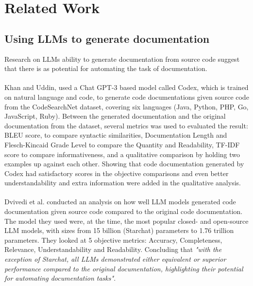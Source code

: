 \section{Related Work}
\subsection{Using LLMs to generate documentation}
\label{sec:related work LLM}
Research on LLMs ability to generate documentation from source code suggest that there is as potential for automating the task of documentation.
\\ \\
Khan and Uddin, \cite{10.1145/3551349.3559548} used a Chat GPT-3 based model called Codex, which is trained on natural language and code, to generate code documentations given source code from the CodeSearchNet dataset, covering six languages (Java, Python, PHP, Go, JavaScript, Ruby). Between the generated documentation and the original documentation from the dataset, several metrics was used to evaluated the result: BLEU score, to compare syntactic similarities, Documentation Length and Flesch-Kincaid Grade Level to compare the Quantity and Readability, TF-IDF score to compare informativeness, and a qualitative comparison by holding two examples up against each other. Showing that code documentation generated by Codex had satisfactory scores in the objective comparisons and even better understandability and extra information were added in the qualitative analysis.
\\ \\
Dvivedi et al. \cite{dvivedi2024comparativeanalysislargelanguage} conducted an analysis on how well LLM models generated code documentation given source code compared to the original code documentation. The model they used were, at the time, the most popular closed- and open-source LLM models, with sizes from 15 billion (Starchat) parameters to 1.76 trillion parameters. They looked at 5 objective metrics: Accuracy, Completeness, Relevance, Understandability and Readability. Concluding that \textit{"with the exception of Starchat, all LLMs demonstrated either equivalent or superior performance compared to the original documentation, highlighting their potential for automating documentation tasks"}.
